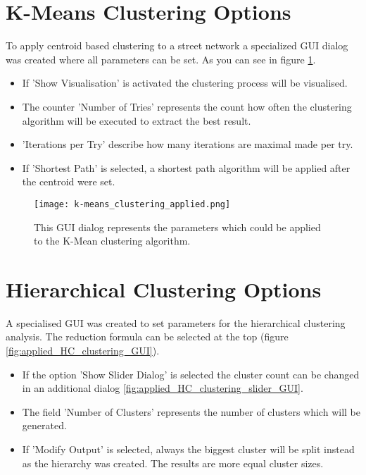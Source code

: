 \section{K-Means Clustering Options} \label{sec:k-means_clustering_options}
To apply centroid based clustering to a street network a specialized \gls{GUI} dialog was created where all parameters can be set. As you can see in figure \ref{fig:applied_k-means_GUI}.
\begin{itemize}
    \item If 'Show Visualisation' is activated the clustering process will be visualised.
    \item The counter 'Number of Tries' represents the count how often the clustering algorithm will be executed to extract the best result.
    \item 'Iterations per Try' describe how many iterations are maximal made per try.
    \item If 'Shortest Path' is selected, a shortest path algorithm will be applied after the centroid were set.
\end{itemize}
\begin{figure}[ht]
    \centering
    \texttt{[image: k-means\_clustering\_applied.png]}
    \caption{This \gls{GUI} dialog represents the parameters which could be applied to the K-Mean clustering algorithm.}
    \label{fig:applied_k-means_GUI}
\end{figure}

\pagebreak
\section{Hierarchical Clustering Options} \label{sec:hierarchical_clustering_options}
A specialised \gls{GUI} was created to set parameters for the hierarchical clustering analysis. The reduction formula can be selected at the top (figure \ref{fig:applied_HC_clustering_GUI}).

\begin{itemize}
    \item If the option 'Show Slider Dialog' is selected the cluster count can be changed in an additional dialog \ref{fig:applied_HC_clustering_slider_GUI}.
    \item The field 'Number of Clusters' represents the number of clusters which will be generated.
    \item If 'Modify Output' is selected, always the biggest cluster will be split instead as the hierarchy was created. The results are more equal cluster sizes.
\end{itemize}

